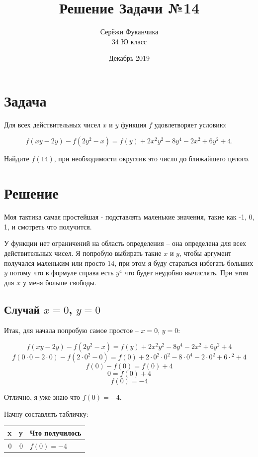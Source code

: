 \documentclass{article}
\title{Решение Задачи №14}
\author{Серёжи Фуканчика\\34 Ю класс}
\date{Декабрь 2019}
\begin{document}
\maketitle

\section{Задача}
Для всех действительных чисел $x$ и $y$ функция $f$ удовлетворяет условию:

$$f(xy-2y)-f(2y^2-x)=f(y)+2x^2y^2-8y^4-2x^2+6y^2+4.$$

Найдите $f(14)$, при необходимости округлив это число до ближайшего целого.

\section{Решение}
Моя тактика самая простейшая - подставлять маленькие значения, такие как -1, 0, 1, и смотреть что получится.

У функции нет ограничений на область определения -- она определена для всех действительных чисел. Я попробую выбирать такие $x$ и $y$, чтобы аргумент получался маленьким или просто $14$, при этом я буду стараться избегать больших $y$ потому что в формуле справа есть $y^4$ что будет неудобно вычислять. При этом для $x$ у меня больше свободы.

\subsection{Случай $x=0$, $y=0$}
Итак, для начала попробую самое простое -- {\boldmath $x=0$, $y=0$}:

$$f(xy-2y)-f(2y^2-x)=f(y)+2x^2y^2-8y^4-2x^2+6y^2+4$$
$$f(0\cdot{}0-2\cdot{}0)-f(2\cdot{}0^2-0)=f(0)+2\cdot{}0^2\cdot{}0^2-8\cdot{}0^4-2\cdot{}0^2+6\cdot{}^2+4$$
$$f(0)-f(0)=f(0)+4$$
$$0=f(0)+4$$
$$f(0)=-4$$

Отлично, я уже знаю что {\boldmath\color{red} $f(0)=-4$}.

\begin{samepage}
Начну составлять табличку:
\begin{center}
 \begin{tabular}{r r l}
 \hline
 x & y & Что получилось \\
 \hline
 0 & 0 & $f(0)=-4$      \\
 \hline
 \end{tabular}
\end{center}
\end{samepage}
\end{document}

